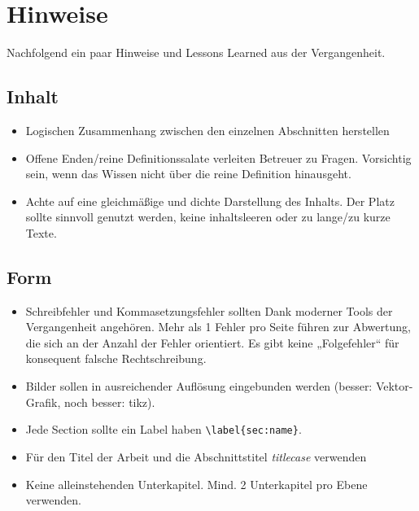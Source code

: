 \clearpage
\section*{Hinweise}
Nachfolgend ein paar Hinweise und Lessons Learned aus der Vergangenheit.

\subsection*{Inhalt}
\begin{itemize}
    \item Logischen Zusammenhang zwischen den einzelnen Abschnitten herstellen
    \item Offene Enden/reine Definitionssalate verleiten Betreuer zu Fragen. Vorsichtig sein, wenn das Wissen nicht über die reine Definition hinausgeht.
    \item Achte auf eine gleichmäßige und dichte Darstellung des Inhalts. Der Platz sollte sinnvoll genutzt werden, keine inhaltsleeren oder zu lange/zu kurze Texte.
\end{itemize}

\subsection*{Form}
\begin{itemize}
    \item Schreibfehler und Kommasetzungsfehler sollten Dank moderner Tools der Vergangenheit angehören. Mehr als 1 Fehler pro Seite führen zur Abwertung, die sich an der Anzahl der Fehler orientiert. Es gibt keine „Folgefehler“ für konsequent falsche Rechtschreibung.
    \item Bilder sollen in ausreichender Auflösung eingebunden werden (besser: Vektor-Grafik, noch besser: tikz).
    \item Jede Section sollte ein Label haben {\lstset{basicstyle=\ttfamily\bfseries}\lstinline|\label{sec:name}|}.
    \item Für den Titel der Arbeit und die Abschnittstitel \textit{titlecase} verwenden
    \item Keine alleinstehenden Unterkapitel. Mind. 2 Unterkapitel pro Ebene verwenden.
\end{itemize}

